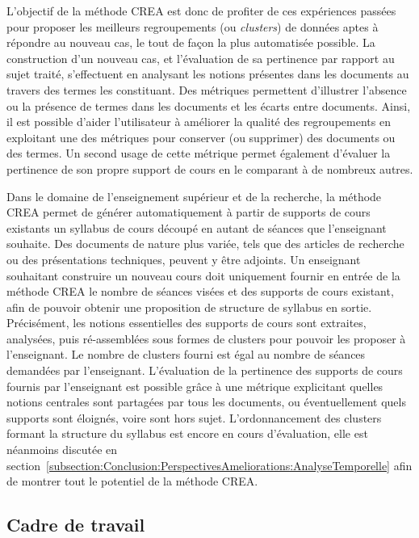 L'objectif de la méthode CREA est donc de profiter de ces expériences passées pour proposer les meilleurs regroupements (ou \textit{clusters}) de données aptes à répondre au nouveau cas, le tout de façon la plus automatisée possible.
La construction d'un nouveau cas, et l'évaluation de sa pertinence par rapport au sujet traité, s'effectuent en analysant les notions présentes dans les documents au travers des termes les constituant.
Des métriques permettent d'illustrer l'absence ou la présence de termes dans les documents et les écarts entre documents.
Ainsi, il est possible d'aider l'utilisateur à améliorer la qualité des regroupements en exploitant une des métriques pour conserver (ou supprimer) des documents ou des termes.
Un second usage de cette métrique permet également d'évaluer la pertinence de son propre support de cours en le comparant à de nombreux autres.

\bigskip

Dans le domaine de l'enseignement supérieur et de la recherche, la méthode CREA permet de générer automatiquement à partir de supports de cours existants un syllabus de cours découpé en autant de séances que l'enseignant souhaite.
Des documents de nature plus variée, tels que des articles de recherche ou des présentations techniques, peuvent y être adjoints.
Un enseignant souhaitant construire un nouveau cours doit uniquement fournir en entrée de la méthode CREA le nombre de séances visées et des supports de cours existant, afin de pouvoir obtenir une proposition de structure de syllabus en sortie.
Précisément, les notions essentielles des supports de cours sont extraites, analysées, puis ré-assemblées sous formes de clusters pour pouvoir les proposer à l'enseignant.
Le nombre de clusters fourni est égal au nombre de séances demandées par l'enseignant.
L'évaluation de la pertinence des supports de cours fournis par l'enseignant est possible grâce à une métrique explicitant quelles notions centrales sont partagées par tous les documents, ou éventuellement quels supports sont éloignés, voire sont hors sujet.
L'ordonnancement des clusters formant la structure du syllabus est encore en cours d'évaluation, elle est néanmoins discutée en section~\ref{subsection:Conclusion:PerspectivesAmeliorations:AnalyseTemporelle} afin de montrer tout le potentiel de la méthode CREA.



\subsection{Cadre de travail}
\label{subsection:CREA:CadreTravail}

